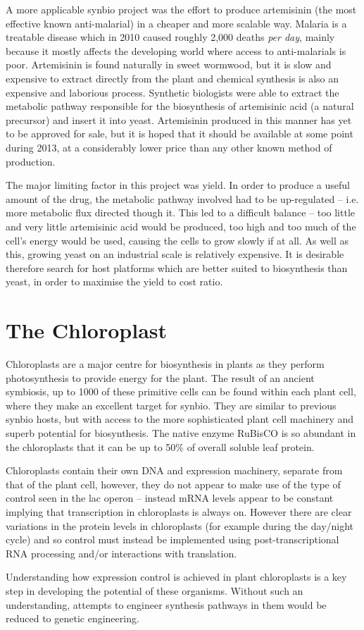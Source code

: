 A more applicable synbio project was the effort to produce 
artemisinin (the most effective known anti-malarial) in a cheaper and more 
scalable way.
Malaria is a treatable disease which in 2010 caused roughly 2,000 deaths 
\emph{per day}, mainly because it mostly affects the developing world where
access to anti-malarials is poor.
Artemisinin is found naturally in sweet wormwood, but it is slow and expensive
to extract directly from the plant and chemical synthesis is also an expensive
and laborious process.
Synthetic biologists were able to extract the metabolic pathway responsible for
the biosynthesis of artemisinic acid (a natural precursor) and insert it into 
yeast\cite{yeast}.
Artemisinin produced in this manner has yet to be approved for sale, but it is
hoped that it should be available at some point during 2013, at a considerably
lower price than any other known method of production.

The major limiting factor in this project was yield.
In order to produce a useful amount of the drug, the metabolic pathway 
involved had to be up-regulated -- i.e. more metabolic flux directed though it.
This led to a difficult balance -- too little and very little
artemisinic acid would be produced, too high and too much of the cell's
energy would be used, causing the cells to grow slowly if at all.
As well as this, growing yeast on an industrial scale is relatively expensive.
It is desirable therefore search for host platforms which are better suited to
biosynthesis than yeast, in order to maximise the yield to cost ratio.

\section{The Chloroplast}
\label{sec:intro_plants}

Chloroplasts are a major centre for biosynthesis in plants as they perform
photosynthesis to provide energy for the plant.
The result of an ancient symbiosis, up to 1000 of these primitive cells can be 
found within each plant cell, where they make an excellent target for synbio.
They are similar to previous synbio hosts, but with access to the more
sophisticated plant cell machinery and superb potential for biosynthesis.
The native enzyme RuBisCO is so abundant in the chloroplasts that it 
can be up to 50\% of overall soluble leaf protein.

Chloroplasts contain their own DNA and expression machinery, separate from that
of the plant cell, however, they do not appear to make use of the type of
control seen in the lac operon -- instead mRNA levels appear to be
constant\cite{Sugita1996} implying that transcription in chloroplasts is always
on.
However there are clear variations in the protein levels in chloroplasts (for
example during the day/night cycle) and so control must instead be implemented 
using post-transcriptional RNA processing and/or interactions with translation.

Understanding how expression control is achieved in plant chloroplasts is a key
step in developing the potential of these organisms.
Without such an understanding, attempts to engineer synthesis pathways in them
would be reduced to genetic engineering.



